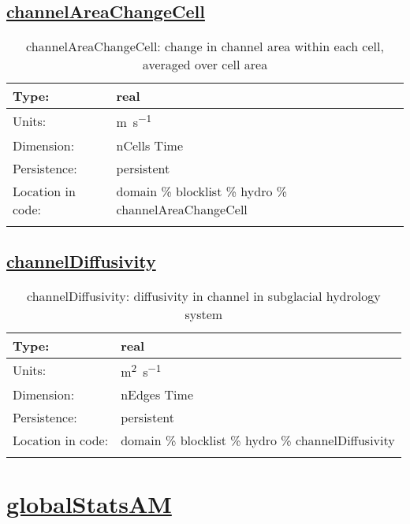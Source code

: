 \subsection[channelAreaChangeCell]{\hyperref[sec:var_tab_hydro]{channelAreaChangeCell}}
\label{subsec:var_sec_hydro_channelAreaChangeCell}
\begin{center}
\begin{longtable}{| p{2.0in} | p{4.0in} |}
        \hline 
        Type: & real \\
        \hline 
        Units: & \si{m.s^{-1}} \\
        \hline 
        Dimension: & nCells Time \\
        \hline 
        Persistence: & persistent \\
        \hline 
         Location in code: & domain \% blocklist \% hydro \% channelAreaChangeCell \\
         \hline 
    \caption{channelAreaChangeCell: change in channel area within each cell, averaged over cell area}
\end{longtable}
\end{center}
\subsection[channelDiffusivity]{\hyperref[sec:var_tab_hydro]{channelDiffusivity}}
\label{subsec:var_sec_hydro_channelDiffusivity}
\begin{center}
\begin{longtable}{| p{2.0in} | p{4.0in} |}
        \hline 
        Type: & real \\
        \hline 
        Units: & \si{m^{2}.s^{-1}} \\
        \hline 
        Dimension: & nEdges Time \\
        \hline 
        Persistence: & persistent \\
        \hline 
         Location in code: & domain \% blocklist \% hydro \% channelDiffusivity \\
         \hline 
    \caption{channelDiffusivity: diffusivity in channel in subglacial hydrology system}
\end{longtable}
\end{center}
\section[globalStatsAM]{\hyperref[sec:var_tab_globalStatsAM]{globalStatsAM}}
\label{sec:var_sec_globalStatsAM}
